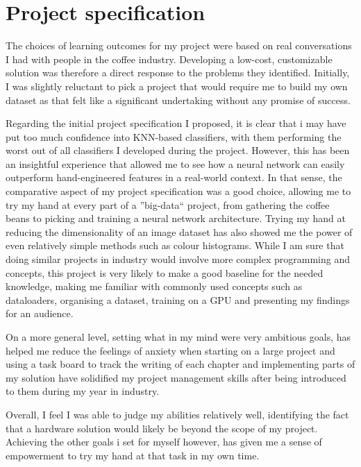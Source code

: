 \documentclass[12pt]{article}
\begin{document}
    \thispagestyle{fancy}
    \section{Project specification}
    \label{sec:section-1}
    The choices of learning outcomes for my project were based on real conversations I had with people in the coffee industry.
    Developing a low-cost, customizable solution was therefore a direct response to the problems they identified.
    Initially, I was slightly reluctant to pick a project that would require me to build my own dataset as that felt like a significant
    undertaking without any promise of success.

    Regarding the initial project specification I proposed, it is clear that i may have put too much confidence into KNN-based classifiers,
    with them performing the worst out of all classifiers I developed during the project.
    However, this has been an insightful experience that allowed me to see how a neural network can easily outperform hand-engineered features
    in a real-world context.
    In that sense, the comparative aspect of my project specification was a good choice, allowing me to try my hand at every part
    of a ''big-data`` project, from gathering the coffee beans to picking and training a neural network architecture.
    Trying my hand at reducing the dimensionality of an image dataset has also showed me the power of even relatively simple methods such as colour histograms.
    While I am sure that doing similar projects in industry would involve more complex programming and concepts, this project is very likely
    to make a good baseline for the needed knowledge, making me familiar with commonly used concepts such as dataloaders, organising a dataset,
    training on a GPU and presenting my findings for an audience.

    On a more general level, setting what in my mind were very ambitious goals, has helped me reduce the feelings of anxiety when starting on a large project
    and using a task board to track the writing of each chapter and implementing parts of my solution have solidified my project management skills after being introduced to them
    during my year in industry.

    Overall, I feel I was able to judge my abilities relatively well, identifying the fact that a hardware solution would likely be beyond
    the scope of my project.
    Achieving the other goals i set for myself however, has given me a sense of empowerment to try my hand at that task in my own time.
\end{document}
